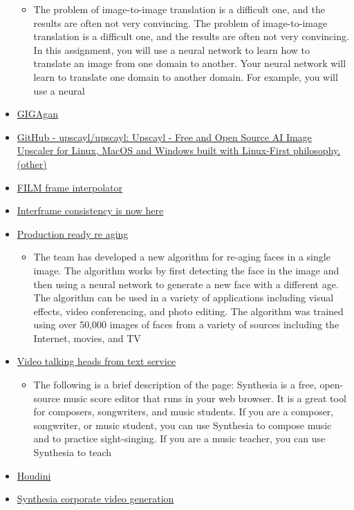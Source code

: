 \begin{itemize}
  \begin{itemize}
  
  \item
    The problem of image-to-image translation is a difficult one, and
    the results are often not very convincing. The problem of
    image-to-image translation is a difficult one, and the results are
    often not very convincing. In this assignment, you will use a neural
    network to learn how to translate an image from one domain to
    another. Your neural network will learn to translate one domain to
    another domain. For example, you will use a neural
  \end{itemize}
\item
  \href{https://mingukkang.github.io/GigaGAN/}{GIGAgan}
\item
  \href{https://github.com/upscayl/upscayl}{GitHub - upscayl/upscayl:
  Upscayl - Free and Open Source AI Image Upscaler for Linux, MacOS and
  Windows built with Linux-First philosophy. (other)}
\item
  \href{https://film-net.github.io/}{FILM frame interpolator}
\item
  \href{https://twitter.com/cut_pow/status/1576748659051749377}{Interframe
  consistency is now here}
\item
  \href{https://studios.disneyresearch.com/2022/11/30/production-ready-face-re-aging-for-visual-effects/}{Production
  ready re aging}

  \begin{itemize}
  
  \item
    The team has developed a new algorithm for re-aging faces in a
    single image. The algorithm works by first detecting the face in the
    image and then using a neural network to generate a new face with a
    different age. The algorithm can be used in a variety of
    applications including visual effects, video conferencing, and photo
    editing. The algorithm was trained using over 50,000 images of faces
    from a variety of sources including the Internet, movies, and TV
  \end{itemize}
\item
  \href{https://www.synthesia.io/}{Video talking heads from text
  service}

  \begin{itemize}
  
  \item
    The following is a brief description of the page: Synthesia is a
    free, open-source music score editor that runs in your web browser.
    It is a great tool for composers, songwriters, and music students.
    If you are a composer, songwriter, or music student, you can use
    Synthesia to compose music and to practice sight-singing. If you are
    a music teacher, you can use Synthesia to teach
  \end{itemize}
\item
  \href{https://github.com/proceduralit/StableDiffusion_Houdini}{Houdini}
\item
  \href{https://www.youtube.com/watch?v=4uzzD9sD-PI}{Synthesia corporate
  video generation}


\end{itemize}
